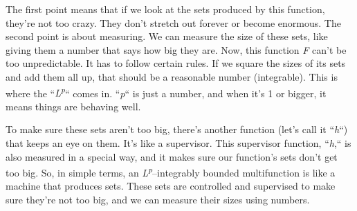 \documentclass[12pt,a4paper]{report}
\numberwithin{equation}{section}
\begin{document}
The first point means that if we look at the sets produced by this
function, they're not too crazy. They don't stretch out forever or
become enormous. The second point is about measuring. We can measure the
size of these sets, like giving them a number that says how big they
are. Now, this function \emph{F} can't be too unpredictable. It has to
follow certain rules. If we square the sizes of its sets and add them
all up, that should be a reasonable number (integrable). This is where
the ``\emph{L\textsuperscript{p}}`` comes in. ``\emph{p}`` is just a number,
and when it's 1 or bigger, it means things are behaving well.

To make sure these sets aren't too big, there's another function (let's
call it ``\emph{h}``) that keeps an eye on them. It's like a supervisor.
This supervisor function, ``\emph{h},`` is also measured in a special way,
and it makes sure our function's sets don't get too big. So, in simple
terms, an \emph{L\textsuperscript{p}}--integrably bounded multifunction
is like a machine that produces sets. These sets are controlled and
supervised to make sure they're not too big, and we can measure their
sizes using numbers.
\end{document}
